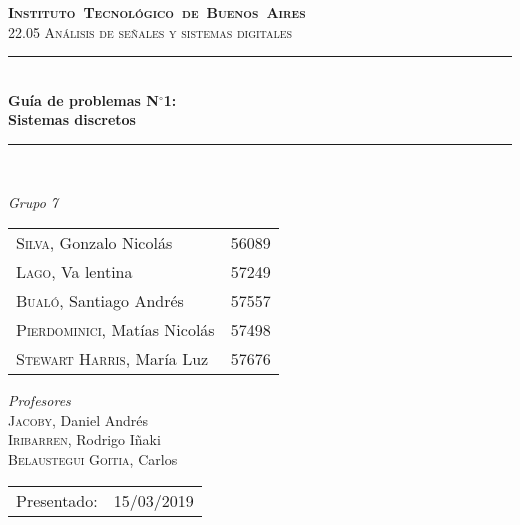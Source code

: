 \begin{titlepage}
\newcommand{\HRule}{\rule{\linewidth}{0.5mm}}
\center
\mbox{\textsc{\LARGE \bfseries {Instituto Tecnol\'ogico de Buenos Aires}}}\\[1.5cm]
\textsc{\Large 22.05 An\'alisis de señales y sistemas digitales}\\[0.5cm]


\HRule \\[0.6cm]
{ \Huge \bfseries Gu\'ia de problemas N$^\circ$1: \\ Sistemas discretos}\\[0.4cm] %
\HRule \\[1.5cm]


{\large

\emph{Grupo 7}\\
\vspace{3px}

\begin{tabular}{lr} 	
\textsc{Silva}, Gonzalo Nicol\'as & 56089 \\
\textsc{Lago}, Va lentina & 57249 \\ 	
\textsc{Bual\'o}, Santiago Andr\'es & 57557 \\
\textsc{Pierdominici}, Mat\'ias Nicol\'as & 57498 \\
\textsc{Stewart Harris}, Mar\'ia Luz  & 57676 \\ 	     
\end{tabular}

\vspace{20px}

\emph{Profesores}\\
\vspace{3px}
\textsc{Jacoby,} Daniel Andr\'es\\ 	
\textsc{Iribarren,} Rodrigo I\~naki\\
\textsc{Belaustegui Goitia,} Carlos \\

\vspace{100px}

\begin{tabular}{ll}

Presentado: & 15/03/2019\\

\end{tabular}

}

\vfill

\end{titlepage}